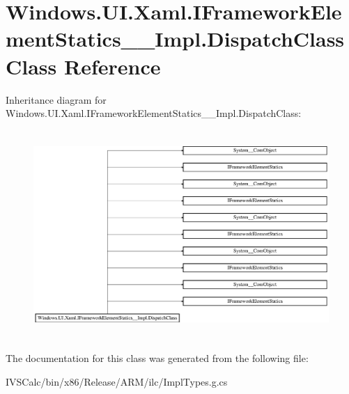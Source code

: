 \hypertarget{class_windows_1_1_u_i_1_1_xaml_1_1_i_framework_element_statics_____impl_1_1_dispatch_class}{}\section{Windows.\+U\+I.\+Xaml.\+I\+Framework\+Element\+Statics\+\_\+\+\_\+\+Impl.\+Dispatch\+Class Class Reference}
\label{class_windows_1_1_u_i_1_1_xaml_1_1_i_framework_element_statics_____impl_1_1_dispatch_class}
Inheritance diagram for Windows.\+U\+I.\+Xaml.\+I\+Framework\+Element\+Statics\+\_\+\+\_\+\+Impl.\+Dispatch\+Class\+:\begin{figure}[H]
\begin{center}
\leavevmode
\includegraphics[height=7.938145cm]{class_windows_1_1_u_i_1_1_xaml_1_1_i_framework_element_statics_____impl_1_1_dispatch_class}
\end{center}
\end{figure}


The documentation for this class was generated from the following file\+:\begin{DoxyCompactItemize}
\item 
I\+V\+S\+Calc/bin/x86/\+Release/\+A\+R\+M/ilc/Impl\+Types.\+g.\+cs\end{DoxyCompactItemize}

